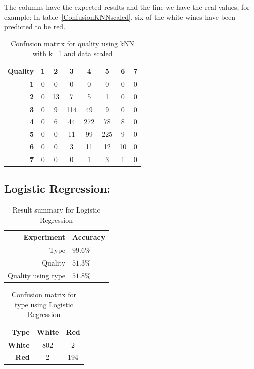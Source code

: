 \documentclass[twoside]{article}
\begin{document}
\begin{multicols}{2}
The columns have the expected results and the line we have the real values, for example: In table~\ref{ConfusionKNNscaled}, six of the white wines have been predicted to be red.

\begin{table}[H]
\caption{Confusion matrix for quality using kNN with k=1 and data scaled}
\centering
\begin{tabular}{r||c|c|c|c|c|c|c}
\textbf{Quality} & \textbf{1} & \textbf{2} & \textbf{3} & \textbf{4} & \textbf{5} & \textbf{6} & \textbf{7}\\
\hline \hline
\textbf{1} & 0 & 0 & 0 & 0 & 0 & 0 & 0\\
\hline
\textbf{2} & 0 & 13 & 7 & 5 & 1 & 0 & 0\\
\hline
\textbf{3} & 0 & 9 & 114 & 49 & 9 & 0 & 0\\
\hline
\textbf{4} & 0 & 6 & 44 & 272 & 78 & 8 & 0\\
\hline
\textbf{5} & 0 & 0 & 11 & 99 & 225 & 9 & 0\\
\hline
\textbf{6} & 0 & 0 & 3 & 11 & 12 & 10 & 0\\
\hline
\textbf{7} & 0 & 0 & 0 & 1 & 3 & 1 & 0\\
\end{tabular}
\end{table}


\subsection*{\textbf{Logistic Regression:}}
\begin{table}[H]
\caption{Result summary for Logistic Regression}
\centering
\begin{tabular}{r|l}
\textbf{Experiment} & \textbf{Accuracy}\\
\midrule
Type & $99.6\%$\\
Quality & $51.3\%$\\
Quality using type & $51.8\%$\\
\end{tabular}
\end{table}

\begin{table}[H]
\caption{Confusion matrix for type using Logistic Regression}
\centering
\begin{tabular}{r||c|c}
\textbf{Type} & \textbf{White} & \textbf{Red} \\
\hline \hline
\textbf{White} & 802  & 2\\
\hline
\textbf{Red} & 2 & 194\\
\end{tabular}
\end{table}


\end{multicols}
\end{document}

